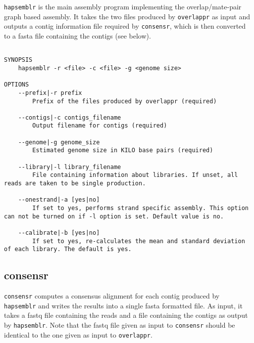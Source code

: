 \documentclass[12pt,a4paper]{report}
\begin{document}
\texttt{hapsemblr} is the main assembly program implementing the overlap/mate-pair graph based assembly. It takes the two files produced by \texttt{overlappr} as input and outputs a contig information file required by \texttt{consensr}, which is then converted to a fasta file containing the contigs (see below).

\begin{lstlisting}

SYNOPSIS
    hapsemblr -r <file> -c <file> -g <genome size>

OPTIONS 
    --prefix|-r prefix
        Prefix of the files produced by overlappr (required) 

    --contigs|-c contigs_filename 
        Output filename for contigs (required) 

    --genome|-g genome_size 
        Estimated genome size in KILO base pairs (required) 

    --library|-l library_filename 
        File containing information about libraries. If unset, all reads are taken to be single production. 

    --onestrand|-a [yes|no] 
        If set to yes, performs strand specific assembly. This option can not be turned on if -l option is set. Default value is no. 

    --calibrate|-b [yes|no] 
        If set to yes, re-calculates the mean and standard deviation of each library. The default is yes. 

\end{lstlisting}

\subsection{consensr}
\label{cons}

\texttt{consensr} computes a consensus alignment for each contig produced by \texttt{hapsemblr} and writes the results into a single fasta formatted file. As input, it takes a fastq file containing the reads and a file containing the contigs as output by \texttt{hapsemblr}. Note that the fastq file given as input to \texttt{consensr} should be identical to the one given as input to \texttt{overlappr}.
\end{document}
